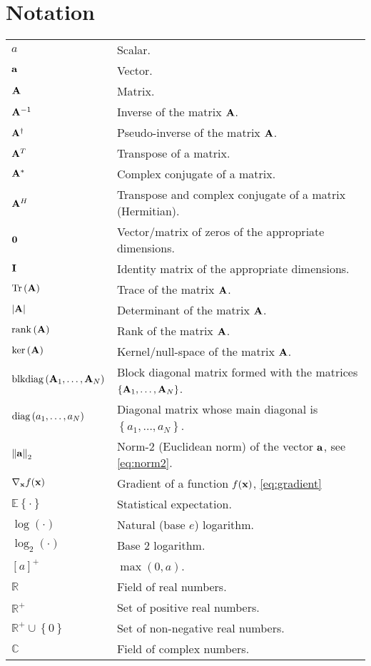 \chapter*{Notation}

{ %
\renewcommand{\arraystretch}{1.5}

\begin{tabularx}{\textwidth}{lX}
$a$ & Scalar. \\
$\aa$ & Vector. \\
$\AA$ & Matrix. \\
$\AA^{-1}$ & Inverse of the matrix $\AA$. \\
$\AA^\dagger$ & Pseudo-inverse of the matrix $\AA$. \\
$\AA^T$ & Transpose of a matrix. \\
$\AA^\ast$ & Complex conjugate of a matrix. \\
$\AA^H$ & Transpose and complex conjugate of a matrix
    (Hermitian). \\
$\zero$ & Vector/matrix of zeros of the appropriate dimensions. \\
$\eye$ & Identity matrix of the appropriate dimensions. \\

$\Tr\left(\AA\right)$ & Trace of the matrix $\AA$. \\
$\left|\AA\right|$ & Determinant of the matrix $\AA$. \\
$\rank\left(\AA\right)$ & Rank of the matrix $\AA$. \\
$\ker\left(\AA\right)$ & Kernel/null-space of the matrix $\AA$. \\
$\blkdiag\left(\AA_1, \ldots, \AA_N\right)$ & Block diagonal matrix
    formed with the matrices $\left\{\AA_1, \ldots, \AA_N\right\}$. \\
$\diag\left(a_1, \ldots, a_N\right)$ & Diagonal matrix whose main
    diagonal is $\left\{a_1, \ldots, a_N\right\}$. \\
$\left\|\aa\right\|_2$ & Norm-2 (Euclidean norm) of the vector $\aa$, see
    \eqref{eq:norm2}. \\
$\nablabf_{\xx}f(\xx)$ & Gradient of a function $f(\xx)$,
    \eqref{eq:gradient} \\
$\mathbb{E}\left\{\cdot\right\}$ & Statistical expectation. \\
$\log\left(\cdot\right)$ & Natural (base $e$) logarithm. \\
$\log_2\left(\cdot\right)$ & Base 2 logarithm. \\
$\left[ a \right]^+$ & $\max\left( 0,a \right)$. \\
$\mathbb{R}$ & Field of real numbers. \\
$\mathbb{R}^+$ & Set of positive real numbers. \\
$\mathbb{R}^+ \cup \left\{0\right\}$ & Set of non-negative real numbers. \\
$\mathbb{C}$ & Field of complex numbers.
\end{tabularx}

}
